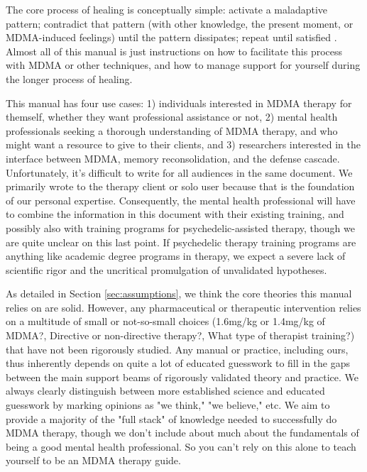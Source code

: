 \documentclass[12pt,letterpaper]{book}
\begin{document}
The core process of healing is conceptually simple: activate a maladaptive pattern; contradict that pattern (with other knowledge, the present moment, or MDMA-induced feelings) until the pattern dissipates; repeat until satisfied \cite{eckerUnlocking}. Almost all of this manual is just instructions on how to facilitate this process with MDMA or other techniques, and how to manage support for yourself during the longer process of healing.

This manual has four use cases: 1) individuals interested in MDMA therapy for themself, whether they want professional assistance or not, 2) mental health professionals seeking a thorough understanding of MDMA therapy, and who might want a resource to give to their clients, and 3) researchers interested in the interface between MDMA, memory reconsolidation, and the defense cascade. Unfortunately, it's difficult to write for all audiences in the same document. We primarily wrote to the therapy client or solo user because that is the foundation of our personal expertise. Consequently, the mental health professional will have to combine the information in this document with their existing training, and possibly also with training programs for psychedelic-assisted therapy, though we are quite unclear on this last point. If psychedelic therapy training programs are anything like academic degree programs in therapy, we expect a severe lack of scientific rigor and the uncritical promulgation of unvalidated hypotheses. 

As detailed in Section \ref{sec:assumptions}, we think the core theories this manual relies on are solid. However, any pharmaceutical or therapeutic intervention relies on a multitude of small or not-so-small choices (1.6mg/kg or 1.4mg/kg of MDMA?, Directive or non-directive therapy?, What type of therapist training?) that have not been rigorously studied. Any manual or practice, including ours, thus inherently depends on quite a lot of educated guesswork to fill in the gaps between the main support beams of rigorously validated theory and practice. We always clearly distinguish between more established science and educated guesswork by marking opinions as "we think," "we believe," etc. We aim to provide a majority of the "full stack" of knowledge needed to successfully do MDMA therapy, though we don't include about much about the fundamentals of being a good mental health professional. So you can't rely on this alone to teach yourself to be an MDMA therapy guide.

\end{document}
